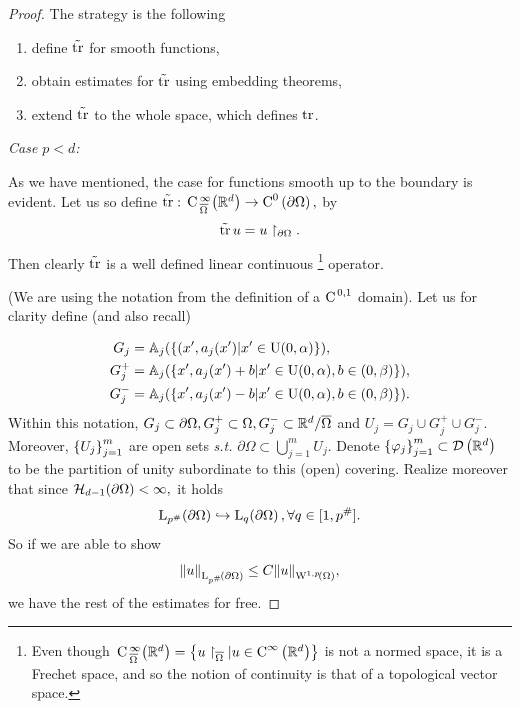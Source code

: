 \documentclass{article}
\begin{document}
\begin{proof}
	The strategy is the following

	\begin{enumerate}
		\item define $\tilde{\trace}$ for smooth functions,
		\item obtain estimates for $\tilde{\trace}$ using embedding theorems,
		\item extend $\tilde{\trace}$ to the whole space, which defines $\trace$.
	\end{enumerate}

	\textit{Case $p<d$:}

	As we have mentioned, the case for functions smooth up to the boundary is evident. Let us so define $\tilde{\trace}:\, \text{C} \,^{\infty}_{\overline{\Omega}}\qty(\R^{d}) \to \CkSet{0}{\partial \Omega},$ by
	\[
		\tilde{\trace}\, u = u \restriction_{\partial \Omega}.
	\]
	Then clearly $\tilde{\trace}$ is a well defined linear continuous \footnote{Even though  $\, \text{C} \,^{\infty}_{\overline{\Omega}}\qty({\mathbb R}^{d}) = \qty{u \restriction_{\overline{\Omega}}| u \in  \ensuremath{\text{C}^{\infty}\!\,\left({\mathbb R}^{d} \right)}}$ is not a normed space, it is a Frechet space, and so the notion of continuity is that of a topological vector space.} operator. 

	(We are using the notation from the definition of a $\text{C}^{\!\,\, 0,1}$ domain). Let us for clarity define (and also recall)

	\begin{align*}
		G_j &= \mathbb{A}_j\qty(\qty{(x',a_j(x')| x' \in \text{U}(0,\alpha)}),\\
		G_j^+ &= \mathbb{A}_j\qty(\qty{x', a_j(x') + b| x' \in \text{U}(0,\alpha), b \in (0, \beta)}), \\
		G_j^{-} &= \mathbb{A}_j\qty(\qty{x', a_j(x') - b| x' \in \text{U}(0,\alpha), b \in (0,\beta)}).
	\end{align*}
	Within this notation, $G_j \subset \partial \Omega, G_j^{+} \subset \Omega, G_j^{-} \subset {\mathbb R}^{d}/ \overline{\Omega}$ and $U_j = G_j \cup G_j^{+} \cup G_j^{-}.$ Moreover, $\qty{U_j}_{j=1}^m$ are open sets \textit{s.t.} $\partial \Omega \subset \bigcup_{j=1}^m U_j.$ Denote $\qty{\varphi_j}_{j=1}^m \subset \mathcal{D}\!\,\left({\mathbb R}^{d} \right)$ to be the partition of unity subordinate to this (open) covering. Realize moreover that since $\mathcal{H}_{d-1}\qty(\partial \Omega) < \infty,$ it holds
	\[
		\LpSet[p^{\#}]{\partial \Omega} \hookrightarrow \LpSet[q]{\partial \Omega}, \forall q \in [1, p^{\#}].
	\]
	So if we are able to show
	\[
		\norm{u}_{\LpSet[p^{\#}]{\partial \Omega}}\leq  C \norm{u}_{\WkpSet[1][p]{\Omega}},
	\]
	we have the rest of the estimates for free.


\end{proof}
\end{document}
